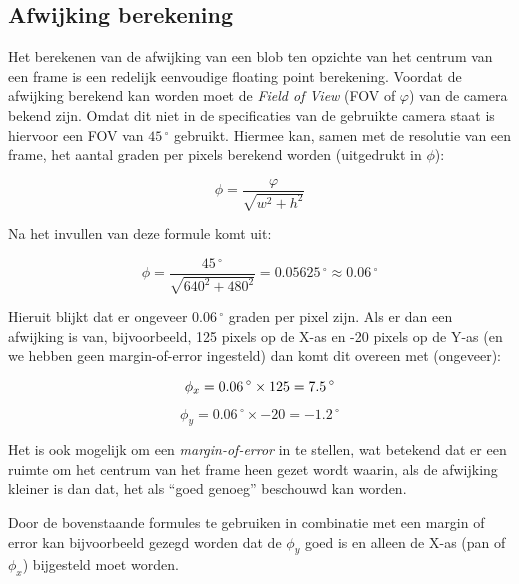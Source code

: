 \subsection{Afwijking berekening}

Het berekenen van de afwijking van een blob ten opzichte van het centrum van
een frame is een redelijk eenvoudige floating point berekening. Voordat de
afwijking berekend kan worden moet de \emph{Field of View} (FOV of $\varphi$)
van de camera bekend zijn. Omdat dit niet in de specificaties van de
gebruikte camera staat is hiervoor een FOV van $45\,^{\circ}$ gebruikt. Hiermee
kan, samen met de resolutie van een frame, het aantal graden per pixels
berekend worden (uitgedrukt in $\phi$):

\[
    \phi = \frac{\varphi}{\sqrt{w^2 + h^2}}
\]

Na het invullen van deze formule komt uit:

\[
    \phi = \frac{45\,^{\circ}}{\sqrt{640^2 + 480^2}} = 0.05625\,^{\circ} \approx 0.06\,^{\circ}
\]

Hieruit blijkt dat er ongeveer $0.06\,^{\circ}$ graden per pixel zijn. Als er
dan een afwijking is van, bijvoorbeeld, 125 pixels op de X-as en -20 pixels op
de Y-as (en we hebben geen margin-of-error ingesteld) dan komt dit overeen met
(ongeveer):

\[
    \phi_x = 0.06\,^{\circ} \times 125 = 7.5\,^{\circ} \\
\]

\[
    \phi_y = 0.06\,^{\circ} \times -20 = -1.2\,^{\circ}
\]

Het is ook mogelijk om een \emph{margin-of-error} in te stellen, wat betekend
dat er een ruimte om het centrum van het frame heen gezet wordt waarin, als de
afwijking kleiner is dan dat, het als ``goed genoeg'' beschouwd kan worden.

Door de bovenstaande formules te gebruiken in combinatie met een margin of
error kan bijvoorbeeld gezegd worden dat de $\phi_y$ goed is en alleen de X-as
(pan of $\phi_x$) bijgesteld moet worden.
